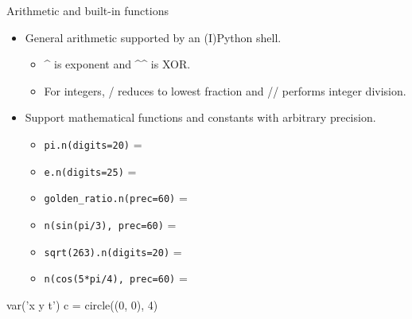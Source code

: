 \documentclass{beamer}
\begin{document}
\begin{frame}[fragile]{Arithmetic and built-in functions}
  \begin{itemize}
   \item General arithmetic supported by an (I)Python shell.
   \begin{itemize}
    \item \textasciicircum \hspace{0pt} is exponent and \textasciicircum\textasciicircum \hspace{0pt} is XOR.
    \item For integers, / reduces to lowest fraction and // performs integer division.
   \end{itemize}
   \item Support mathematical functions and constants with arbitrary precision.
   \begin{itemize}
    \item \verb+pi.n(digits=20)+ = 
    \item \verb+e.n(digits=25)+ = 
    \item \verb+golden_ratio.n(prec=60)+ = 
    \item \verb+n(sin(pi/3), prec=60)+ = 
    \item \verb+sqrt(263).n(digits=20)+ = 
    \item \verb+n(cos(5*pi/4), prec=60)+ = 
   \end{itemize}
  \end{itemize}
\end{frame}

\begin{sagesilent}
 var('x y t')
 c = circle((0, 0), 4)
\end{sagesilent}
\end{document}
